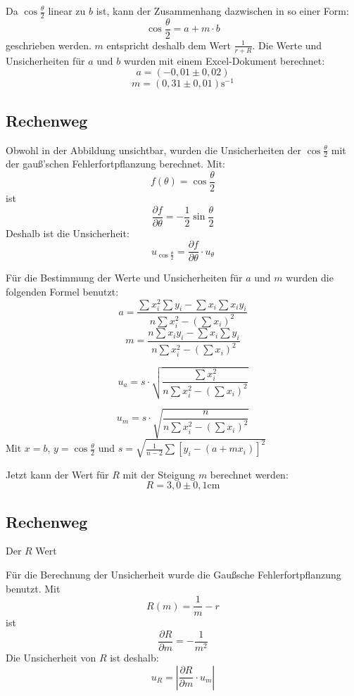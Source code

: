 \documentclass[11pt,a4paper]{article}
\begin{document}
Da $\cos{\frac{\theta}{2}}$ linear zu $b$ ist, kann der Zusammenhang dazwischen in so einer Form:
$$ \cos{\frac{\theta}{2}} = a+m\cdot b$$
geschrieben werden. $m$ entspricht deshalb dem Wert $\frac{1}{r+R}$. Die Werte und Unsicherheiten für $a$ und $b$ wurden mit einem Excel-Dokument berechnet:
$$ a = (-0,01 \pm 0,02) $$
$$ m = (0,31 \pm 0,01) \textrm{s}^{-1} $$

\begin{tcolorbox}[colback=white]
\subsection{Rechenweg}
Obwohl in der Abbildung unsichtbar, wurden die Unsicherheiten der $\cos{\frac{\theta}{2}}$ mit der gauß'schen Fehlerfortpflanzung berechnet. 
Mit:
$$f(\theta) = \cos\frac{\theta}{2}$$
ist
$$\frac{\partial f}{\partial \theta} = -\frac{1}{2}\sin\frac{\theta}{2}$$
Deshalb ist die Unsicherheit:
$$u_{\cos\frac{\theta}{2}} = \frac{\partial f}{\partial \theta}\cdot u_\theta$$

Für die Bestimmung der Werte und Unsicherheiten für $a$ und $m$ wurden die folgenden Formel benutzt:
$$a = \frac{
	\sum x_i^2 \sum y_i - \sum x_i \sum x_iy_i
}{
	n \sum x_i^2 - (\sum x_i)^2
}$$
$$ m = \frac{
	n\sum x_iy_i-\sum x_i \sum y_i
}{
	n \sum x_i^2 - (\sum x_i)^2
}$$

$$u_a = s\cdot \sqrt{
	\frac{
		\sum x_i^2
	}{
		n\sum x_i^2 - (\sum x_i)^2
}}$$

$$u_m = s\cdot \sqrt{
	\frac{
		n
	}{
		n\sum x_i^2 - (\sum x_i)^2
}}$$
Mit $x = b$, $y = \cos\frac{\theta}{2}$ und $s = \sqrt{
	\frac{1}{n-2}\sum [y_i-(a+mx_i)]^2}$
	
\end{tcolorbox}

Jetzt kann der Wert für $R$ mit der Steigung $m$ berechnet werden:
$$ R = {3,0 \pm 0,1} \textrm{cm} $$

\begin{tcolorbox}[colback=white]
\subsection{Rechenweg}
Der $R$ Wert 


Für die Berechnung der Unsicherheit wurde die Gaußsche Fehlerfortpflanzung benutzt. Mit
$$R(m) = \frac{1}{m}-r$$ 
ist
$$\frac{\partial R}{\partial m} = -\frac{1}{m^2}$$
Die Unsicherheit von $R$ ist deshalb:
$$u_R = \left|\frac{\partial R}{\partial m}\cdot u_m\right|$$

	
\end{tcolorbox}
\end{document}
